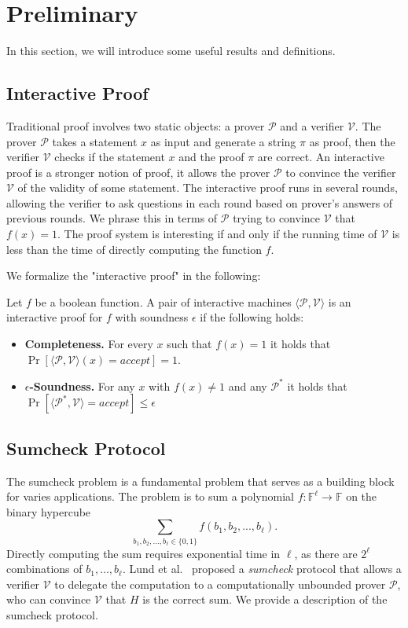 \section{Preliminary}
\label{sec::prelim}
In this section, we will introduce some useful results and definitions.
\subsection{Interactive Proof}
Traditional proof involves two static objects: a prover $\mathcal{P}$ and a verifier $\mathcal{V}$. The prover $\mathcal{P}$ takes a statement $x$ as input and generate a string $\pi$ as proof, then the verifier $\mathcal{V}$ checks if the statement $x$ and the proof $\pi$ are correct. An interactive proof is a stronger notion of proof, it allows the prover $\mathcal{P}$ to convince the verifier $\mathcal{V}$ of the validity of some statement. The interactive proof runs in several rounds, allowing the verifier to ask questions in each round based on prover's answers of previous rounds. We phrase this in terms of $\mathcal{P}$ trying to convince $\mathcal{V}$ that $f(x)=1$. The proof system is interesting if and only if the running time of $\mathcal{V}$ is less than the time of directly computing the function $f$.

We formalize the "interactive proof" in the following:	
\begin{definition}
	Let $f$ be a boolean function. A pair of interactive machines $\langle\mathcal{P}, \mathcal{V}\rangle$ is an interactive proof for $f$ with soundness $\epsilon$ if the following holds:
	\begin{itemize}
		\item {\bf Completeness.} For every $x$ such that $f(x) = 1$ it holds that $\Pr[\langle\mathcal{P}, \mathcal{V}\rangle(x)=accept]=1$.
		\item {\bf $\epsilon$-Soundness.} For any $x$ with $f(x) \neq 1$ and any $\mathcal{P}^*$ it holds that $\Pr[\langle\mathcal{P^*},\mathcal{V}\rangle=accept] \le \epsilon$
	\end{itemize}
\end{definition}

\subsection{Sumcheck Protocol}
\label{subsec::sumcheck}
The sumcheck problem is a fundamental problem that serves as a building block for varies applications. The problem is to sum a polynomial $f: \mathbb{F}^\ell \rightarrow \mathbb{F}$ on the binary hypercube $$\sum\limits_{b_1,b_2,\ldots,b_\ell\in\{0,1\}}f(b_1,b_2,...,b_\ell).$$ 
Directly computing the sum requires exponential time in $\ell$, as there are $2^\ell$ combinations of $b_1,\ldots,b_\ell$. Lund et al.~\cite{sumcheck} proposed a \emph{sumcheck} protocol that allows a verifier $\mathcal{V}$ to delegate the computation to a computationally unbounded prover $\mathcal{P}$, who can convince $\mathcal{V}$ that $H$ is the correct sum. We provide a description of the sumcheck protocol.

